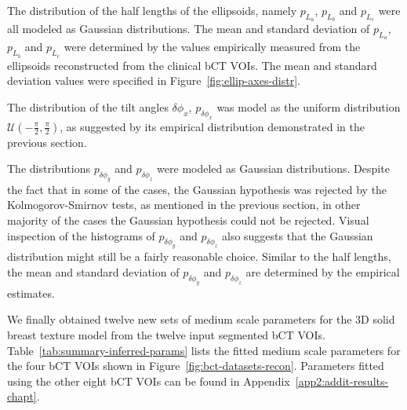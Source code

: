 \documentclass[journal]{IEEEtran}
\begin{document}
The distribution of the half lengths of the ellipsoids, namely
$p_{L_a}$, $p_{L_b}$ and $p_{L_c}$ were all modeled as Gaussian
distributions. The mean and standard deviation of $p_{L_a}$, $p_{L_b}$
and $p_{L_c}$ were determined by the values empirically measured from
the ellipsoids reconstructed from the clinical bCT VOIs. The mean and
standard deviation values were specified in
Figure~\ref{fig:ellip-axes-distr}.

The distribution of the tilt angles $\delta\phi_x$, $p_{\delta\phi_x}$
was model as the uniform distribution
$\mathcal{U} \left( -\frac{\pi}{2}, \frac{\pi}{2} \right)$, as
suggested by its empirical distribution demonstrated in the previous
section.

The distributions $p_{\delta\phi_y}$ and $p_{\delta\phi_z}$ were
modeled as Gaussian distributions. Despite the fact that in some of
the cases, the Gaussian hypothesis was rejected by the
Kolmogorov-Smirnov tests, as mentioned in the previous section, in
other majority of the cases the Gaussian hypothesis could not be
rejected. Visual inspection of the histograms of $p_{\delta\phi_y}$
and $p_{\delta\phi_z}$ also suggests that the Gaussian distribution
might still be a fairly reasonable choice. Similar to the half
lengths, the mean and standard deviation of $p_{\delta\phi_y}$ and
$p_{\delta\phi_z}$ are determined by the empirical estimates.

We finally obtained twelve new sets of medium scale parameters for the
3D solid breast texture model from the twelve input segmented bCT
VOIs. Table~\ref{tab:summary-inferred-params} lists the fitted medium
scale parameters for the four bCT VOIs shown in
Figure~\ref{fig:bct-datasets-recon}. Parameters fitted using the other
eight bCT VOIs can be found in
Appendix~\ref{app2:addit-results-chapt}.
\end{document}

